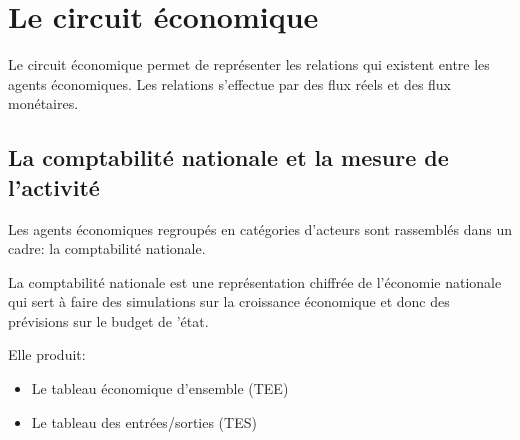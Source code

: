 \documentclass[12pt,a4paper,openany]{book}
\begin{document}
	\section{Le circuit économique}
	Le circuit économique permet de représenter les relations qui existent entre les agents économiques. Les relations s'effectue par des flux réels et
	des flux monétaires.

	\subsection{La comptabilité nationale et la mesure de l'activité}
	Les agents économiques regroupés en catégories d'acteurs sont rassemblés dans un cadre: la comptabilité nationale.

	La comptabilité nationale est une représentation chiffrée de l'économie nationale qui sert à faire des simulations sur la croissance économique et
	donc des prévisions sur le budget de 'état.

	Elle produit: 
	\begin{itemize}
		\item Le tableau économique d'ensemble (TEE)
		\item Le tableau des entrées/sorties (TES)
	\end{itemize}
\end{document}
